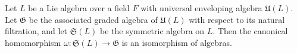 
Let $L$ be a Lie algebra over a field $F$ with universal enveloping algebra $\mathfrak{U}(L)$. Let $\mathfrak{G}$ be the associated graded algebra of $\mathfrak{U}(L)$ with respect to its natural filtration, and let $\mathfrak{S}(L)$ be the symmetric algebra on $L$. Then the canonical homomorphism $\omega: \mathfrak{S}(L) \to \mathfrak{G}$ is an isomorphism of algebras.
